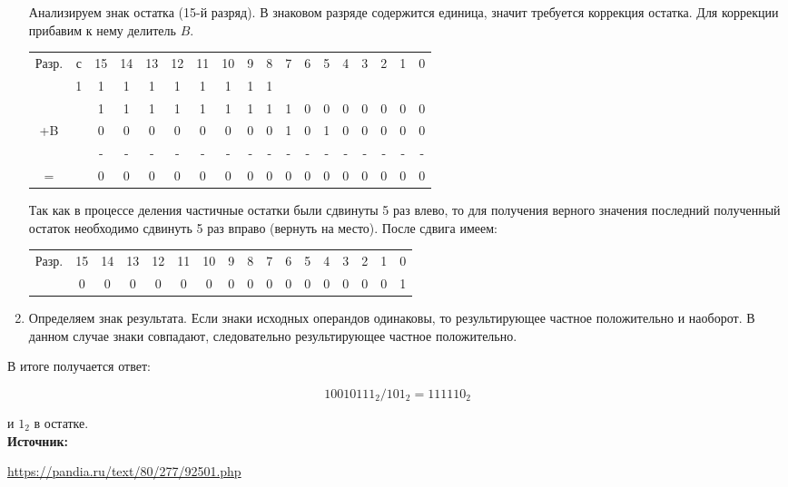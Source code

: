 \documentclass[12pt,a4paper]{scrartcl}
\begin{document}
\begin{enumerate}
	\subitem Анализируем знак остатка (15-й разряд). В знаковом разряде содержится единица, значит требуется коррекция остатка. Для коррекции прибавим к нему делитель $B$.
	
	\begin{table}[H]
		\centering
		\begin{tabular}{cccccccccccccccccc}
			Разр. & с  & 15 & 14 & 13 & 12 & 11 & 10 & 9 & 8 & 7 & 6 & 5 & 4 & 3 & 2 & 1 & 0                     \\
			& 1   & 1  & 1  & 1  & 1  & 1  & 1  & 1 & 1 &   &   &   &   &   &   &   &   \\
			&     & 1  & 1  & 1  & 1  & 1  & 1  & 1 & 1 & 1 & 0 & 0 & 0 & 0 & 0 & 0 & 0 \\
			+B    &    & 0  & 0  & 0  & 0  & 0  & 0  & 0 & 0 & 1 & 0 & 1 & 0 & 0 & 0 & 0 & 0                     \\
			&     & -  & -  & -  & -  & -  & -  & - & - & - & - & - & - & - & - & - & -                     \\
			=     &    & 0  & 0  & 0  & 0  & 0  & 0  & 0 & 0 & 0 & 0 & 0 & 0 & 0 & 0 & 0 & 0                    
		\end{tabular}
	\end{table}
	
	\subitem Так как в процессе деления частичные остатки были сдвинуты 5 раз влево, то для получения верного значения последний полученный остаток необходимо сдвинуть 5 раз вправо (вернуть на место). После сдвига имеем:
	
	\begin{table}[H]
		\centering
		\begin{tabular}{ccccccccccccccccc}
			Разр. & 15 & 14 & 13 & 12 & 11 & 10 & 9 & 8 & 7 & 6 & 5 & 4 & 3 & 2 & 1 & 0 \\
			& 0  & 0  & 0  & 0  & 0  & 0  & 0 & 0 & 0 & 0 & 0 & 0 & 0 & 0 & 0 & 1
		\end{tabular}
	\end{table}
	
	\item Определяем знак результата. Если знаки исходных операндов одинаковы, то результирующее частное положительно и наоборот. В данном случае знаки совпадают, следовательно результирующее частное положительно.
	
\end{enumerate}

В итоге получается ответ:

$$10010111_2  / 101_2 = 111110_2$$

и $1_2$ в остатке.\\

\textbf{Источник:}

\href{https://pandia.ru/text/80/277/92501.php}{https://pandia.ru/text/80/277/92501.php}
	
\end{document}
